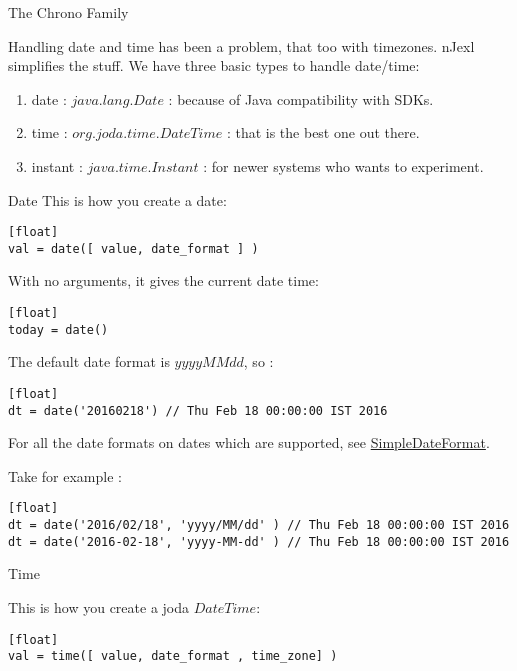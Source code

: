 \begin{section}{The Chrono Family}

Handling date and time has been a problem, that too with timezones.
nJexl simplifies the stuff. 
We have three basic types to handle date/time:
\begin{enumerate}
\item{date : $java.lang.Date$ : because of Java compatibility with SDKs. }
\item{time : $org.joda.time.DateTime$ : that is the best one out there. }
\item{instant : $java.time.Instant$ : for newer systems who wants to experiment. }
\end{enumerate}


\begin{subsection}{Date}
This is how you create a date:
\begin{lstlisting}[style=JexlStyle][float]
val = date([ value, date_format ] )
\end{lstlisting}

With no arguments, it gives the current date time:

\begin{lstlisting}[style=JexlStyle][float]
today = date()
\end{lstlisting}

The default date format is $yyyyMMdd$, so :
\begin{lstlisting}[style=JexlStyle][float]
dt = date('20160218') // Thu Feb 18 00:00:00 IST 2016
\end{lstlisting}

For all the date formats on dates which are supported, 
see \href{https://docs.oracle.com/javase/8/docs/api/java/text/SimpleDateFormat.html}{SimpleDateFormat}.

Take for example :

\begin{lstlisting}[style=JexlStyle][float]
dt = date('2016/02/18', 'yyyy/MM/dd' ) // Thu Feb 18 00:00:00 IST 2016
dt = date('2016-02-18', 'yyyy-MM-dd' ) // Thu Feb 18 00:00:00 IST 2016
\end{lstlisting}


\end{subsection}

\begin{subsection}{Time}

This is how you create a joda $DateTime$:
\begin{lstlisting}[style=JexlStyle][float]
val = time([ value, date_format , time_zone] )
\end{lstlisting}


\end{subsection}
\end{section}

